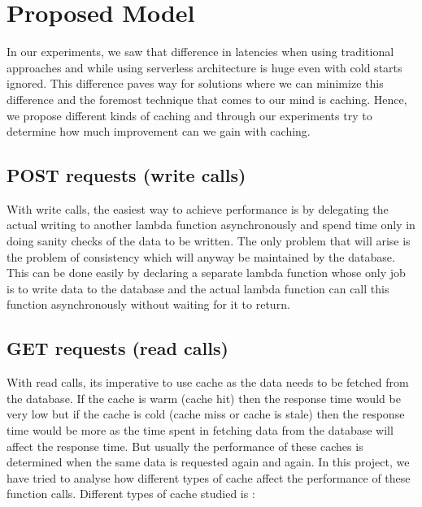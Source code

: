 
\chapter{Proposed Model} %

\label{Chapter 4} %


In our experiments, we saw that difference in latencies when using traditional approaches and while using serverless architecture is huge even with cold starts ignored. This difference paves way for solutions where we can minimize this difference and the foremost technique that comes to our mind is caching. Hence, we propose different kinds of caching and through our experiments try to determine how much improvement can we gain with caching.

\section{POST requests (write calls)}

With write calls, the easiest way to achieve performance is by delegating the actual writing to another lambda function asynchronously and spend time only in doing sanity checks of the data to be written. The only problem that will arise is the problem of consistency which will anyway be maintained by the database. This can be done easily by declaring a separate lambda function whose only job is to write data to the database and the actual lambda function can call this function asynchronously without waiting for it to return.

\section{GET requests (read calls)}

With read calls, its imperative to use cache as the data needs to be fetched from the database. If the cache is warm (cache hit) then the response time would be very low but if the cache is cold (cache miss or cache is stale) then the response time would be more as the time spent in fetching data from the database will affect the response time. But usually the performance of these caches is determined when the same data is requested again and again. In this project, we have tried to analyse how different types of cache affect the performance of these function calls. Different types of cache studied is :

